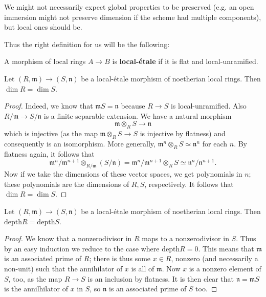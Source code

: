 We might not necessarily expect global properties to be preserved (e.g. an
open immersion might not preserve dimension if the scheme had multiple
components), but local ones should be.

Thus the right definition for us will be the following:
\begin{definition} 
A morphism of local rings $A \to B$ is \textbf{local-\'etale} if it is flat
and local-unramified.
\end{definition} 


\begin{proposition}  \label{dimpreserved}
Let $(R, \mathfrak{m}) \to (S, \mathfrak{n})$ be a local-\'etale morphism of noetherian local
rings. Then $\dim R = \dim S$. 
\end{proposition} 
\begin{proof} 
Indeed, we know that $\mathfrak{m}S = \mathfrak{n}$ because $R \to S$ is
local-unramified.
Also $R/\mathfrak{m}\to S/\mathfrak{n}$ is a finite separable extension.
We have a natural morphism
\[ \mathfrak{m} \otimes_R S \to \mathfrak{n}  \]
which is injective (as the map $\mathfrak{m} \otimes_R S \to S$ is injective by
flatness) and consequently is an isomorphism.
More generally, $\mathfrak{m}^n \otimes_R S \simeq \mathfrak{n}^n$ for each $n$.
By flatness again, it follows that
\begin{equation} \label{thisiso} \mathfrak{m}^n/\mathfrak{m}^{n+1} \otimes_{R/\mathfrak{m}}
(S/\mathfrak{n}) =  \mathfrak{m}^n/\mathfrak{m}^{n+1} \otimes_R S \simeq
\mathfrak{n}^n/\mathfrak{n}^{n+1}. \end{equation}
Now if we take the dimensions of these vector spaces, we get polynomials in
$n$; these polynomials are the dimensions of $R, S$, respectively. It follows
that $\dim R = \dim S$.
\end{proof} 



\newcommand{\depth}{\mathrm{depth}}
\begin{proposition} \label{depthpreserved}
Let $(R, \mathfrak{m}) \to (S, \mathfrak{n})$ be a local-\'etale morphism of noetherian local
rings. 
Then $\depth R = \depth S$.
\end{proposition} 
\begin{proof} 
We know that a nonzerodivisor in $R$ maps to a nonzerodivisor in $S$. Thus by
an easy induction we reduce to the case where $\depth R = 0$. 
This means that $\mathfrak{m}$ is an associated prime of $R$; there is thus
some $x \in R$, nonzero (and necessarily a non-unit) such that the annihilator
of $x$ is all of $\mathfrak{m}$. Now $x$ is a nonzero element of $S$, too, as
the map $R \to S$ is an inclusion by flatness. 
It is then clear that $\mathfrak{n} = \mathfrak{m}S$ is the annilhilator of
$x$ in $S$, so $\mathfrak{n}$ is an associated prime of $S$ too.
\end{proof} 

